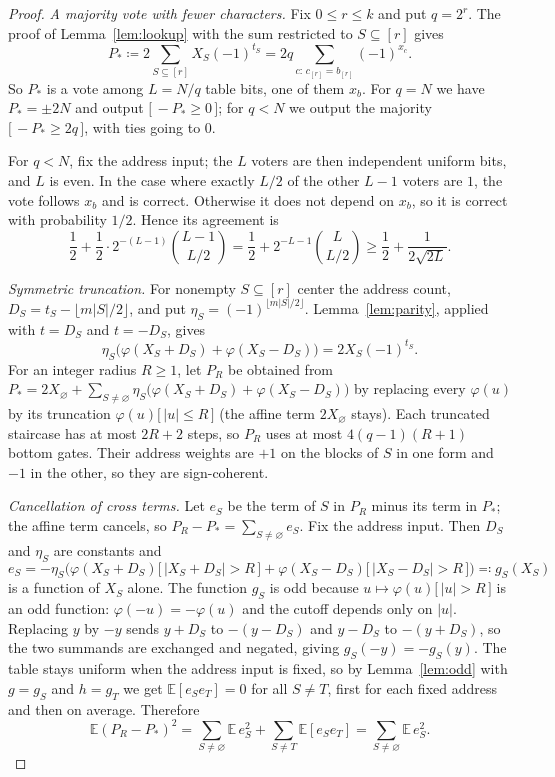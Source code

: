 \documentclass[11pt,letterpaper]{article}
\theoremstyle{remark}
\newcommand{\ind}[1]{\bigl[\,#1\,\bigr]}
\begin{document}
\begin{proof}
\emph{A majority vote with fewer characters.}
Fix $0\le r\le k$ and put $q=2^r$. The proof of Lemma~\ref{lem:lookup} with
the sum restricted to $S\subseteq[r]$ gives
\[
P_*\coloneqq2\sum_{S\subseteq[r]}X_S(-1)^{t_S}
 =2q\sum_{c:\,c_{[r]}=b_{[r]}}(-1)^{x_c}.
\]
So $P_*$ is a vote among $L=N/q$ table bits, one of them $x_b$. For $q=N$
we have $P_*=\pm2N$ and output $\ind{-P_*\ge0}$; for $q<N$ we output the
majority $\ind{-P_*\ge2q}$, with ties going to $0$.

For $q<N$, fix the address input; the $L$ voters are then independent
uniform bits, and $L$ is even. In the case where exactly $L/2$ of the other
$L-1$ voters are $1$, the vote follows $x_b$ and is correct. Otherwise it does
not depend on $x_b$, so it is correct with probability $1/2$. Hence its agreement is
\[
\frac12+\frac12\cdot2^{-(L-1)}\binom{L-1}{L/2}=\frac12+2^{-L-1}\binom{L}{L/2}
\ge\frac12+\frac1{2\sqrt{2L}}.
\]

\emph{Symmetric truncation.}
For nonempty $S\subseteq[r]$ center the address count,
$D_S=t_S-\lfloor m|S|/2\rfloor$, and put
$\eta_S=(-1)^{\lfloor m|S|/2\rfloor}$. Lemma~\ref{lem:parity}, applied with
$t=D_S$ and $t=-D_S$, gives
\[
\eta_S\bigl(\varphi(X_S+D_S)+\varphi(X_S-D_S)\bigr)=2X_S(-1)^{t_S}.
\]
For an integer radius $R\ge1$, let $P_R$ be obtained from
$P_*=2X_\varnothing+\sum_{S\ne\varnothing}\eta_S\bigl(\varphi(X_S+D_S)+\varphi(X_S-D_S)\bigr)$
by replacing every $\varphi(u)$ by its truncation $\varphi(u)\ind{|u|\le R}$
(the affine term $2X_\varnothing$ stays). Each truncated staircase has at most
$2R+2$ steps, so $P_R$ uses at most $4(q-1)(R+1)$ bottom gates. Their
address weights are $+1$ on the blocks of $S$ in one form and $-1$ in the
other, so they are sign-coherent.

\emph{Cancellation of cross terms.}
Let $e_S$ be the term of $S$ in $P_R$ minus its term in $P_*$; the affine term
cancels, so $P_R-P_*=\sum_{S\ne\varnothing}e_S$. Fix the address input. Then
$D_S$ and $\eta_S$ are constants and
\[
e_S=-\eta_S\bigl(\varphi(X_S+D_S)\ind{|X_S+D_S|>R}+\varphi(X_S-D_S)\ind{|X_S-D_S|>R}\bigr)
\eqqcolon g_S(X_S)
\]
is a function of $X_S$ alone. The function $g_S$ is odd because
$u\mapsto\varphi(u)\ind{|u|>R}$ is an odd function: $\varphi(-u)=-\varphi(u)$
and the cutoff depends only on $|u|$. Replacing $y$ by $-y$ sends $y+D_S$
to $-(y-D_S)$ and $y-D_S$ to $-(y+D_S)$, so the two summands are exchanged
and negated, giving $g_S(-y)=-g_S(y)$. The table stays uniform when the address input is fixed,
so by Lemma~\ref{lem:odd} with $g=g_S$ and $h=g_T$ we get
$\mathbb E[e_Se_T]=0$ for all $S\ne T$, first for each fixed address and then
on average. Therefore
\[
\mathbb E(P_R-P_*)^2=\sum_{S\ne\varnothing}\mathbb E\,e_S^2
+\sum_{S\ne T}\mathbb E[e_Se_T]=\sum_{S\ne\varnothing}\mathbb E\,e_S^2 .
\]


\end{proof}
\end{document}
